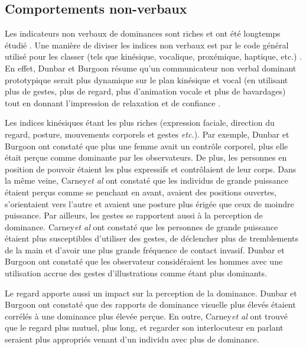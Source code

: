 		\subsection{Comportements non-verbaux}
			Les indicateurs non verbaux de dominances sont riches et ont été longtemps étudié \cite{burgoon1995interpersonal,burgoon1998nature}. Une manière de diviser les indices non verbaux est par le code général utilisé pour les classer (tels que kinésique, vocalique, proxémique, haptique, etc.) \cite{burgoon2006nonverbal}. En effet, Dunbar et Burgoon \cite{dunbar2005perceptions} résume qu'un communicateur non verbal dominant prototypique serait plus dynamique sur le plan kinésique et vocal (en utilisant plus de gestes, plus de regard, plus d'animation vocale et plus de bavardages) tout en donnant l'impression de relaxation et de confiance .
			
			 Les indices kinésiques étant les plus riches (expression faciale, direction du regard, posture, mouvements corporels et gestes \emph{etc.}).
			Par exemple, Dunbar et Burgoon \cite{dunbar2005perceptions} ont constaté que plus une femme avait un contrôle corporel, plus elle était perçue comme dominante par les observateurs. De plus, les personnes en position de pouvoir  étaient les plus expressifs et  contrôlaient de leur corps. Dans la même veine,  Carney\emph{et al}\cite{hall2005nonverbal} ont constaté que les individus de grande puissance étaient perçus comme se penchant en avant, avaient des positions ouvertes, s'orientaient vers l'autre et avaient une posture plus érigée que ceux de moindre puissance. Par ailleurs, les gestes se rapportent aussi à la perception de dominance.  Carney\emph{et al}  \cite{hall2005nonverbal} ont constaté que les personnes de grande puissance étaient plus susceptibles d'utiliser des gestes, de déclencher plus de tremblements de la main et d'avoir une plus grande fréquence de contact invasif. Dunbar et Burgoon \cite{dunbar2005perceptions} ont constaté que les observateur considéraient les hommes avec une utilisation accrue des gestes d'illustrations comme étant plus dominants.
			
			Le regard apporte aussi un impact sur la perception de la dominance. Dunbar et Burgoon \cite{dunbar2005perceptions} ont constaté que des rapports de dominance visuelle plus élevés étaient corrélés à une dominance plus élevée perçue. En outre, Carney\emph{et al} \cite{hall2005nonverbal} ont trouvé que le regard plus mutuel, plus long, et regarder son interlocuteur en parlant seraient plus appropriés venant d'un individu avec plus de dominance.
			
